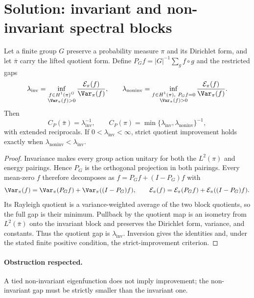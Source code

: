 \documentclass[../main.tex]{subfiles}
\begin{document}

\section*{Solution: invariant and non-invariant spectral blocks}

\begin{proposition}
Let a finite group $G$ preserve a probability measure $\pi$ and its Dirichlet form, and let
$\bar\pi$ carry the lifted quotient form. Define $P_Gf=|G|^{-1}\sum_g f\circ g$ and the
restricted gaps
\[
 \lambda_{\mathrm{inv}}=\inf_{\substack{f\in H^1(\pi)^G\\\Var_\pi(f)>0}}
 \frac{\mathcal E_\pi(f)}{\Var_\pi(f)},\qquad
 \lambda_{\mathrm{noninv}}=\inf_{\substack{f\in H^1(\pi),\ P_Gf=0\\\Var_\pi(f)>0}}
 \frac{\mathcal E_\pi(f)}{\Var_\pi(f)}.
\]
Then
\[
 C_P(\bar\pi)=\lambda_{\mathrm{inv}}^{-1},\qquad
 C_P(\pi)=\min\{\lambda_{\mathrm{inv}},\lambda_{\mathrm{noninv}}\}^{-1},
\]
with extended reciprocals. If $0<\lambda_{\mathrm{inv}}<\infty$, strict quotient improvement
holds exactly when $\lambda_{\mathrm{noninv}}<\lambda_{\mathrm{inv}}$.
\end{proposition}

\begin{proof}
Invariance makes every group action unitary for both the $L^2(\pi)$ and energy pairings. Hence
$P_G$ is the orthogonal projection in both pairings. Every mean-zero $f$ therefore decomposes as
$f=P_Gf+(I-P_G)f$ with
\[
 \Var_\pi(f)=\Var_\pi(P_Gf)+\Var_\pi((I-P_G)f),\qquad
 \mathcal E_\pi(f)=\mathcal E_\pi(P_Gf)+\mathcal E_\pi((I-P_G)f).
\]
Its Rayleigh quotient is a variance-weighted average of the two block quotients, so the full gap
is their minimum. Pullback by the quotient map is an isometry from $L^2(\bar\pi)$ onto the
invariant block and preserves the Dirichlet form, variance, and constants. Thus the quotient gap
is $\lambda_{\mathrm{inv}}$. Inversion gives the identities and, under the stated finite positive
condition, the strict-improvement criterion.
\end{proof}

\paragraph{Obstruction respected.}
A tied non-invariant eigenfunction does not imply improvement; the non-invariant gap must be
strictly smaller than the invariant one.
\end{document}
